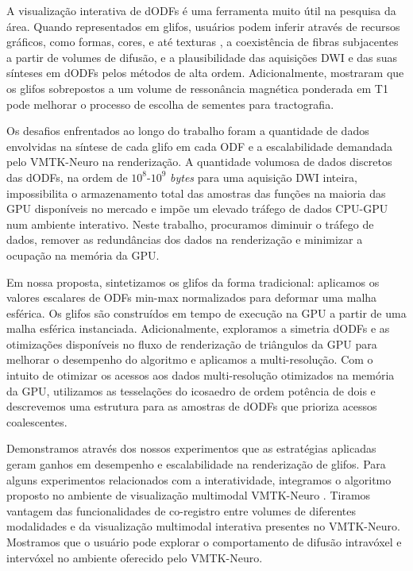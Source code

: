 \documentclass[
    12pt,                %
    oneside,            %
    a4paper,            %
    english,            %
    french,                %
    spanish,            %
    brazil                %
    ]{abntex2}
\begin{document}
A visualização interativa de dODFs é uma ferramenta muito útil na pesquisa da área. Quando representados em glifos, usuários podem inferir através de recursos gráficos, como formas, cores, e até texturas \cite{ware2004}, a coexistência de fibras subjacentes a partir de volumes de difusão, e a plausibilidade das aquisições DWI e das suas sínteses em dODFs pelos métodos de alta ordem. Adicionalmente,  mostraram que os glifos sobrepostos a um volume de ressonância magnética ponderada em T1 pode melhorar o processo de escolha de sementes para tractografia.

Os desafios enfrentados ao longo do trabalho foram a quantidade de dados envolvidas na síntese de cada glifo em cada ODF e a escalabilidade demandada pelo VMTK-Neuro na renderização. A quantidade volumosa de dados discretos das dODFs, na ordem de $10^8$-$10^9$ \textit{bytes} para uma aquisição DWI inteira, impossibilita o armazenamento total das amostras das funções na maioria das GPU disponíveis no mercado e impõe um elevado tráfego de dados CPU-GPU num ambiente interativo. Neste trabalho, procuramos diminuir o tráfego de dados, remover as redundâncias dos dados na renderização e minimizar a ocupação na memória da GPU.

Em nossa proposta, sintetizamos os glifos da forma tradicional: aplicamos os valores escalares de ODFs min-max normalizados para deformar uma malha esférica. Os glifos são construídos em tempo de execução na GPU a partir de uma malha esférica instanciada. Adicionalmente, exploramos a simetria dODFs e as otimizações disponíveis no fluxo de renderização de triângulos da GPU para melhorar o desempenho do algoritmo e aplicamos a multi-resolução.
Com o intuito de otimizar os acessos aos dados multi-resolução otimizados na memória da GPU, utilizamos as tesselações do icosaedro de ordem potência de dois e descrevemos uma estrutura para as amostras de dODFs que prioriza acessos coalescentes.

Demonstramos através dos nossos experimentos que as estratégias aplicadas geram ganhos em desempenho e escalabilidade na renderização de glifos. Para alguns experimentos relacionados com a interatividade, 
integramos o algoritmo proposto no ambiente de visualização multimodal VMTK-Neuro \cite{VMTKNeuro}. Tiramos vantagem das funcionalidades de co-registro entre volumes de diferentes modalidades \cite{ting2014} e da visualização multimodal interativa presentes no VMTK-Neuro. Mostramos que o usuário pode explorar o comportamento de difusão intravóxel e intervóxel no ambiente oferecido pelo VMTK-Neuro.
\end{document}
